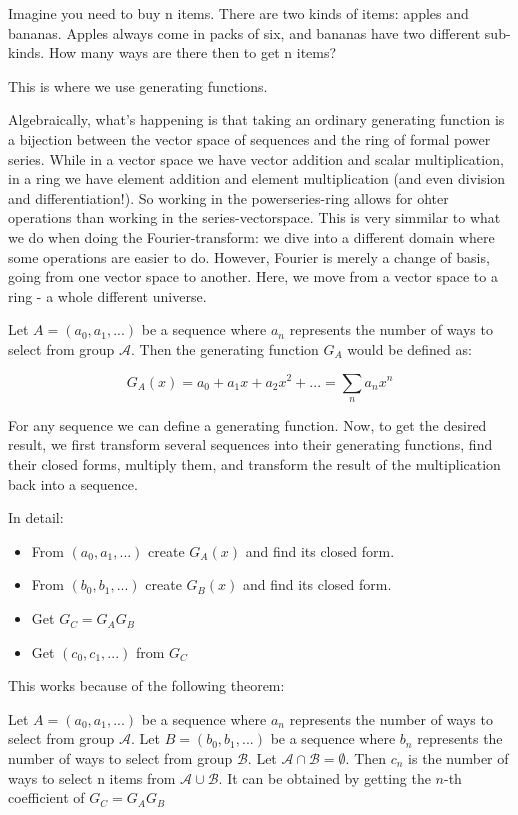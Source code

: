 Imagine you need to buy n items. There are two kinds of items: apples and bananas. Apples always come in packs of six, and bananas have two different sub-kinds. How many ways are there then to get n items?

This is where we use generating functions. 


Algebraically, what's happening is that taking an ordinary generating function is a bijection between the vector space of sequences and the ring of formal power series. While in a vector space we have vector addition and scalar multiplication, in a ring we have element addition and element multiplication (and even division and differentiation!). So working in the powerseries-ring allows for ohter operations than working in the series-vectorspace. This is very simmilar to what we do when doing the Fourier-transform: we dive into a different domain where some operations are easier to do. However, Fourier is merely a change of basis, going from one vector space to another. Here, we move from a vector space to a ring - a whole different universe. 



Let $A = (a_0, a_1, ...)$ be a sequence where $a_n$ represents the number of ways to select from group $\mathcal{A}$. Then the generating function $G_A$ would be defined as: 

$$ G_A (x) = a_0 + a_1 x + a_2 x^2 + ... = \sum_n a_n x^n $$

For any sequence we can define a generating function. Now, to get the desired result, we first transform several sequences into their generating functions, find their closed forms, multiply them, and transform the result of the multiplication back into a sequence. 

In detail: 

\begin{itemize}
    \item From $(a_0, a_1, ...)$ create $G_A(x)$ and find its closed form.
    \item From $(b_0, b_1, ...)$ create $G_B(x)$ and find its closed form.
    \item Get $G_C = G_A G_B$
    \item Get $(c_0, c_1, ...)$ from $G_C$
\end{itemize}

This works because of the following theorem:

\begin{theorem}
    Let $A = (a_0, a_1, ...)$ be a sequence where $a_n$ represents the number of ways to select from group $\mathcal{A}$. Let $B = (b_0, b_1, ...)$ be a sequence where $b_n$ represents the number of ways to select from group $\mathcal{B}$. Let $\mathcal{A} \cap \mathcal{B} = \emptyset$. Then $c_n$ is the number of ways to select n items from $\mathcal{A} \cup \mathcal{B}$. It can be obtained by getting the $n$-th coefficient of $G_C = G_A G_B$
\end{theorem}

